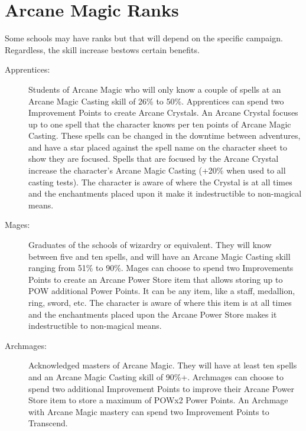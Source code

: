 \section{Arcane Magic Ranks}
Some schools may have ranks but that will depend on the specific campaign. Regardless, the skill increase bestows certain benefits.
\begin{description}
\item[Apprentices:] Students of Arcane Magic who will only know a couple of spells at an Arcane Magic Casting skill of 26\% to 50\%. Apprentices can spend two Improvement Points to create Arcane Crystals. An Arcane Crystal focuses up to one spell that the character knows per ten points of Arcane Magic Casting. These spells can be changed in the downtime between adventures, and have a star placed against the spell name on the character sheet to show they are focused. Spells that are focused by the Arcane Crystal increase the character’s Arcane Magic Casting (+20\% when used to all casting tests). The character is aware of where the Crystal is at all times and the enchantments placed upon it make it indestructible to non-magical means.

\item[Mages:] Graduates of the schools of wizardry or equivalent. They will know between five and ten spells, and will have an Arcane Magic Casting skill ranging from 51\% to 90\%. Mages can choose to spend two Improvements Points to create an Arcane Power Store item that allows storing up to POW additional Power Points. It can be any item, like a staff, medallion, ring, sword, etc. The character is aware of where this item is at all times and the enchantments placed upon the Arcane Power Store makes it indestructible to non-magical means.

\item[Archmages:] Acknowledged masters of Arcane Magic. They will have at least ten spells and an Arcane Magic Casting skill of 90\%+. Archmages can choose to spend two additional Improvement Points to improve their Arcane Power Store item to store a maximum of POWx2 Power Points. An Archmage with Arcane Magic mastery can spend two Improvement Points to Transcend.
\end{description}

